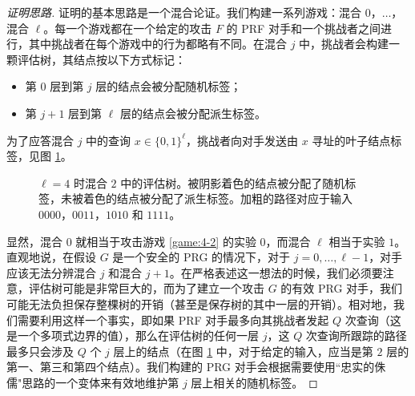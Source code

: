\begin{proof}[证明思路]
证明的基本思路是一个混合论证。我们构建一系列游戏：混合 $0$，$\dots$，混合 $\ell$。每一个游戏都在一个给定的攻击 $F$ 的 PRF 对手和一个挑战者之间进行，其中挑战者在每个游戏中的行为都略有不同。在混合 $j$ 中，挑战者会构建一颗评估树，其结点按以下方式标记：
\begin{itemize}
	\item 第 $0$ 层到第 $j$ 层的结点会被分配随机标签；
	\item 第 $j+1$ 层到第 $\ell$ 层的结点会被分配派生标签。
\end{itemize}
为了应答混合 $j$ 中的查询 $x\in\{0,1\}^\ell$，挑战者向对手发送由 $x$ 寻址的叶子结点标签，见图 \ref{fig:4-16}。

\begin{figure}
  \centering
  
  \caption{$\ell=4$ 时混合 $2$ 中的评估树。被阴影着色的结点被分配了随机标签，未被着色的结点被分配了派生标签。加粗的路径对应于输入 $0000$，$0011$，$1010$ 和 $1111$。}
  \label{fig:4-16}
\end{figure}

显然，混合 $0$ 就相当于攻击游戏 \ref{game:4-2} 的实验 $0$，而混合 $\ell$ 相当于实验 $1$。直观地说，在假设 $G$ 是一个安全的 PRG 的情况下，对于 $j=0,\dots,\ell-1$，对手应该无法分辨混合 $j$ 和混合 $j+1$。在严格表述这一想法的时候，我们必须要注意，评估树可能是非常巨大的，而为了建立一个攻击 $G$ 的有效 PRG 对手，我们可能无法负担保存整棵树的开销（甚至是保存树的其中一层的开销）。相对地，我们需要利用这样一个事实，即如果 PRF 对手最多向其挑战者发起 $Q$ 次查询（这是一个多项式边界的值），那么在评估树的任何一层 $j$，这 $Q$ 次查询所跟踪的路径最多只会涉及 $Q$ 个 $j$ 层上的结点（在图 \ref{fig:4-16} 中，对于给定的输入，应当是第 $2$ 层的第一、第三和第四个结点）。我们构建的 PRG 对手会根据需要使用``忠实的侏儒"思路的一个变体来有效地维护第 $j$ 层上相关的随机标签。
\end{proof}

